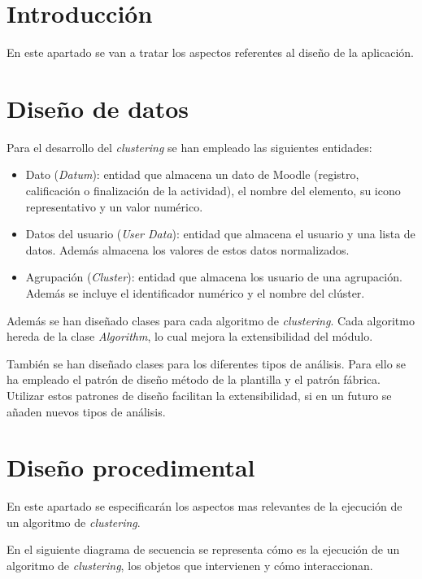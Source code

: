 
\section{Introducción}
En este apartado se van a tratar los aspectos referentes al diseño de la aplicación.
\section{Diseño de datos}
Para el desarrollo del \emph{clustering} se han empleado las siguientes entidades:
\begin{itemize}
	\item Dato (\emph{Datum}): entidad que almacena un dato de Moodle (registro, calificación o finalización de la actividad), el nombre del elemento, su icono representativo y un valor numérico.
	\item Datos del usuario (\emph{User Data}): entidad que almacena el usuario y una lista de datos. Además almacena los valores de estos datos normalizados.
	\item Agrupación (\emph{Cluster}): entidad que almacena los usuario de una agrupación. Además se incluye el identificador numérico y el nombre del clúster.
\end{itemize}

Además se han diseñado clases para cada algoritmo de \emph{clustering}. Cada algoritmo hereda de la clase \emph{Algorithm}, lo cual mejora la extensibilidad del módulo.

También se han diseñado clases para los diferentes tipos de análisis. Para ello se ha empleado el patrón de diseño método de la plantilla y el patrón fábrica. Utilizar estos patrones de diseño facilitan la extensibilidad, si en un futuro se añaden nuevos tipos de análisis.

\section{Diseño procedimental}
En este apartado se especificarán los aspectos mas relevantes de la ejecución de un algoritmo de \emph{clustering}.

En el siguiente diagrama de secuencia se representa cómo es la ejecución de un algoritmo de \emph{clustering}, los objetos que intervienen y cómo interaccionan.

